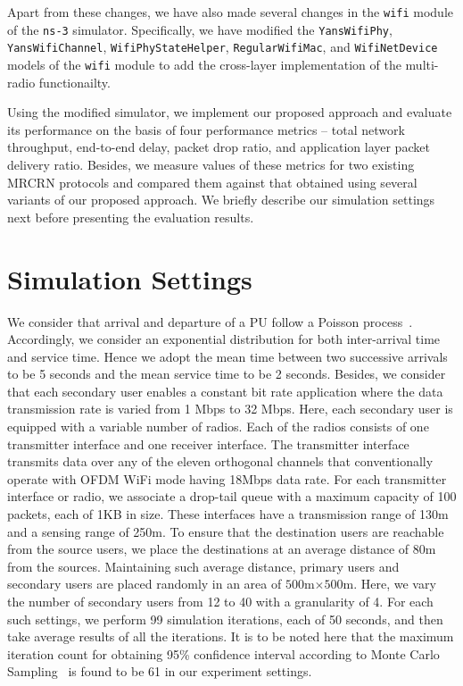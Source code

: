 Apart from these changes, we have also made several changes in the \texttt{wifi} module of the \texttt{ns-3} simulator. Specifically, we have modified the \texttt{YansWifiPhy}, \texttt{YansWifiChannel}, \texttt{WifiPhyStateHelper}, \texttt{RegularWifiMac}, and \texttt{WifiNetDevice} models of the \texttt{wifi} module to add the cross-layer implementation of the multi-radio functionailty.

Using the modified simulator, we implement our proposed approach and evaluate its performance on the basis of four performance metrics -- total network throughput, end-to-end delay, packet drop ratio, and application layer packet delivery ratio. Besides, we measure values of these metrics for two existing MRCRN protocols and compared them against that obtained using several variants of our proposed approach. We briefly describe our simulation settings next before presenting the evaluation results.

\section{Simulation Settings}

We consider that arrival and departure of a PU follow a Poisson process~\cite{heo2008mathematical}. Accordingly, we consider an exponential distribution for both inter-arrival time and service time. Hence we adopt the mean time between two successive arrivals to be 5 seconds and the mean service time to be 2 seconds. Besides, we consider that each secondary user enables a constant bit rate application where the data transmission rate is varied from 1 Mbps to 32 Mbps. Here, each secondary user is equipped with a variable number of radios. Each of the radios consists of one transmitter interface and one receiver interface. The transmitter interface transmits data over any of the eleven orthogonal channels that conventionally operate with OFDM WiFi mode having 18Mbps data rate. For each transmitter interface or radio, we associate a drop-tail queue with a maximum capacity of 100 packets, each of 1KB in size. These interfaces have a transmission range of 130m and a sensing range of 250m. To ensure that the destination users are reachable from the source users, we place the destinations at an average distance of 80m from the sources. Maintaining such average distance, primary users and secondary users are placed randomly in an area of $500$m$\times 500$m. Here, we vary the number of secondary users from 12 to 40 with a granularity of 4. For each such settings, we perform 99 simulation iterations, each of 50 seconds, and then take average results of all the iterations. It is to be noted here that the maximum iteration count for obtaining 95\% confidence interval according to Monte Carlo Sampling~\cite{winston2000simulation} is found to be 61 in our experiment settings. 

